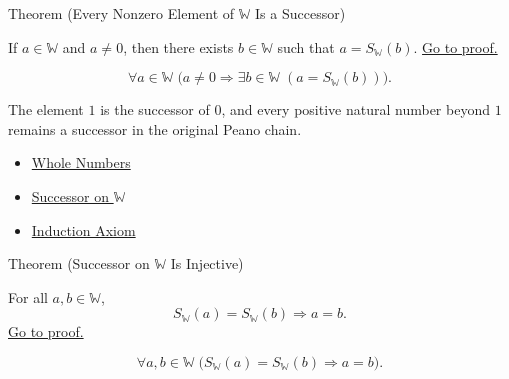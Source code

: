 \begin{theorembox}{Theorem (Every Nonzero Element of \texorpdfstring{$\mathbb{W}$}{W} Is a Successor)}
\begin{theorem}
\label{thm:every-nonzero-w-is-successor}
If $a\in\mathbb{W}$ and $a\neq 0$, then there exists
$b\in\mathbb{W}$ such that $a=S_{\mathbb{W}}(b)$.
\hyperref[prf:every-nonzero-w-is-successor]{Go to proof.}
\end{theorem}
\end{theorembox}

\begin{remark*}
\[
\forall a\in\mathbb{W}\;
\bigl(a\neq 0 \Longrightarrow
\exists b\in\mathbb{W}\;(a=S_{\mathbb{W}}(b))\bigr).
\]
\end{remark*}

\begin{remark*}[Interpretation]
The element $1$ is the successor of $0$, and every positive natural number
beyond $1$ remains a successor in the original Peano chain.
\end{remark*}

\begin{dependencies}
\begin{itemize}
  \item \hyperref[def:whole-numbers]{Whole Numbers}
  \item \hyperref[def:successor-on-w]{Successor on $\mathbb{W}$}
  \item \hyperref[ax:peano-induction]{Induction Axiom}
\end{itemize}
\end{dependencies}

\begin{theorembox}{Theorem (Successor on \texorpdfstring{$\mathbb{W}$}{W} Is Injective)}
\begin{theorem}
\label{thm:successor-on-w-injective}
For all $a,b\in\mathbb{W}$,
\[
S_{\mathbb{W}}(a)=S_{\mathbb{W}}(b)\Longrightarrow a=b.
\]
\hyperref[prf:successor-on-w-injective]{Go to proof.}
\end{theorem}
\end{theorembox}

\begin{remark*}
\[
\forall a,b\in\mathbb{W}\;
\bigl(S_{\mathbb{W}}(a)=S_{\mathbb{W}}(b)\Longrightarrow a=b\bigr).
\]
\end{remark*}


